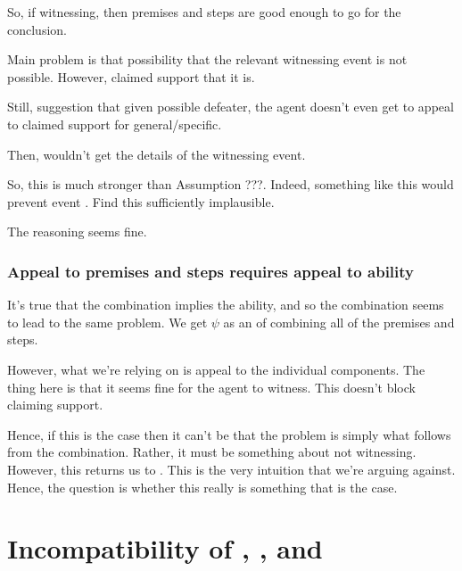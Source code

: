 \begin{note}
  So, if witnessing, then premises and steps are good enough to go for the conclusion.

  Main problem is that possibility that the relevant witnessing event is not possible.
  However, claimed support that it is.

  Still, suggestion that given possible defeater, the agent doesn't even get to appeal to claimed support for general/specific.

  Then, wouldn't get the details of the witnessing event.

  So, this is much stronger than {\color{red} Assumption ???}.
  Indeed, something like this would prevent event \ESU{}.
  Find this sufficiently implausible.

  The reasoning seems fine.
\end{note}

\subsubsection{Appeal to premises and steps requires appeal to ability}

\begin{note}
  It's true that the combination implies the ability, and so the combination seems to lead to the same problem.
  We get \(\psi\) as an \expec{} of combining all of the premises and steps.

  However, what we're relying on is appeal to the individual components.
  The thing here is that it seems fine for the agent to witness.
  This doesn't block claiming support.

  Hence, if this is the case then it can't be that the problem is simply what follows from the combination.
  Rather, it must be something about not witnessing.
  However, this returns us to \ESU{}.
  This is the very intuition that we're arguing against.
  Hence, the question is whether this really is something that is the case.
\end{note}

\section{Incompatibility of \nI{}, \gsi{}, and \adA{}}
\label{sec:ni-summary}

\begin{note}[Table]
    \begin{figure}[h]
      \centering
      \saMtxRuledOutLCS{}
  \end{figure}
\end{note}

